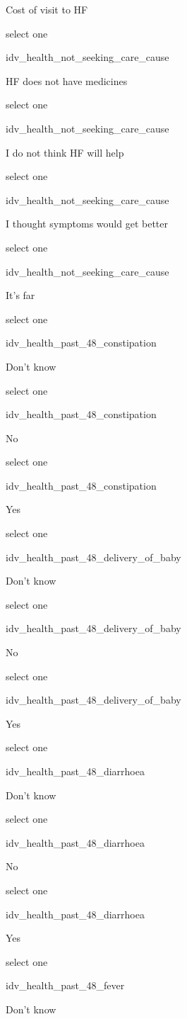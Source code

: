 \documentclass[]{article}
\begin{document}
Cost of visit to HF

select one

idv\_health\_not\_seeking\_care\_cause

HF does not have medicines

select one

idv\_health\_not\_seeking\_care\_cause

I do not think HF will help

select one

idv\_health\_not\_seeking\_care\_cause

I thought symptoms would get better

select one

idv\_health\_not\_seeking\_care\_cause

It's far

select one

idv\_health\_past\_48\_constipation

Don't know

select one

idv\_health\_past\_48\_constipation

No

select one

idv\_health\_past\_48\_constipation

Yes

select one

idv\_health\_past\_48\_delivery\_of\_baby

Don't know

select one

idv\_health\_past\_48\_delivery\_of\_baby

No

select one

idv\_health\_past\_48\_delivery\_of\_baby

Yes

select one

idv\_health\_past\_48\_diarrhoea

Don't know

select one

idv\_health\_past\_48\_diarrhoea

No

select one

idv\_health\_past\_48\_diarrhoea

Yes

select one

idv\_health\_past\_48\_fever

Don't know
\end{document}
